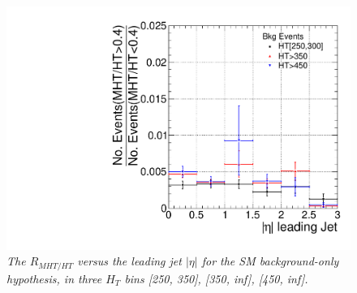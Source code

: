 \begin{figure}[h!]
\centering
\includegraphics[scale=0.4]{./plots/MHTovHT-NT7-Bkg-MCerr}
\caption{\textit{The $R_{MHT/HT}$ versus the leading jet $|\eta|$ for the SM background-only hypothesis, in three $H_{T}$ bins [250, 350], [350, inf], [450, inf].} }
\label{fig:app3}
\end{figure}

